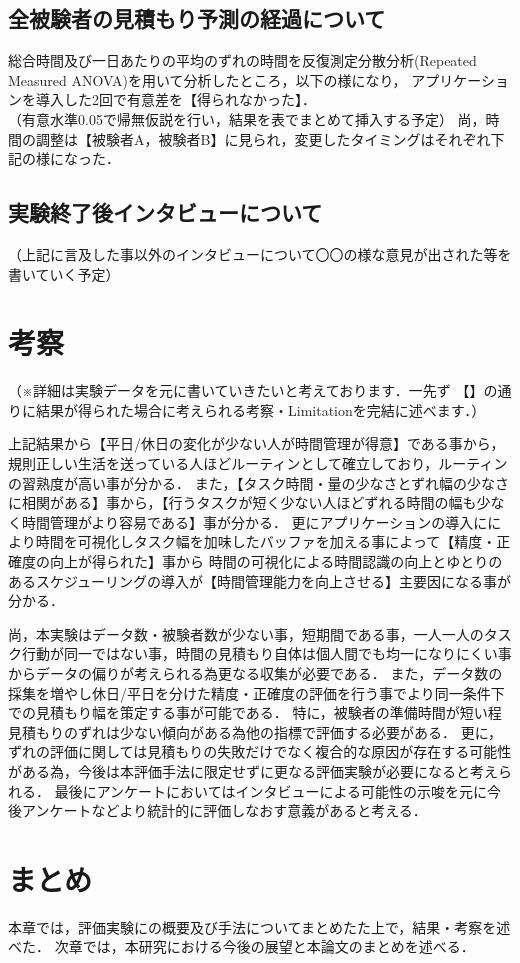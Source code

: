 \subsection{全被験者の見積もり予測の経過について}
総合時間及び一日あたりの平均のずれの時間を反復測定分散分析(Repeated Measured ANOVA)を用いて分析したところ，以下の様になり，
アプリケーションを導入した2回で有意差を【得られなかった】．
\\
（有意水準0.05で帰無仮説を行い，結果を表でまとめて挿入する予定）
尚，時間の調整は【被験者A，被験者B】に見られ，変更したタイミングはそれぞれ下記の様になった．


\subsection{実験終了後インタビューについて}
（上記に言及した事以外のインタビューについて〇〇の様な意見が出された等を書いていく予定）


\section{考察}
（※詳細は実験データを元に書いていきたいと考えております．一先ず
【】の通りに結果が得られた場合に考えられる考察・Limitationを完結に述べます．）

上記結果から【平日/休日の変化が少ない人が時間管理が得意】である事から，規則正しい生活を送っている人ほどルーティンとして確立しており，ルーティンの習熟度が高い事が分かる．
また，【タスク時間・量の少なさとずれ幅の少なさに相関がある】事から，【行うタスクが短く少ない人ほどずれる時間の幅も少なく時間管理がより容易である】事が分かる．
更にアプリケーションの導入ににより時間を可視化しタスク幅を加味したバッファを加える事によって【精度・正確度の向上が得られた】事から
時間の可視化による時間認識の向上とゆとりのあるスケジューリングの導入が【時間管理能力を向上させる】主要因になる事が分かる．

尚，本実験はデータ数・被験者数が少ない事，短期間である事，一人一人のタスク行動が同一ではない事，時間の見積もり自体は個人間でも均一になりにくい事からデータの偏りが考えられる為更なる収集が必要である．
また，データ数の採集を増やし休日/平日を分けた精度・正確度の評価を行う事でより同一条件下での見積もり幅を策定する事が可能である．
特に，被験者の準備時間が短い程見積もりのずれは少ない傾向がある為他の指標で評価する必要がある．
更に，ずれの評価に関しては見積もりの失敗だけでなく複合的な原因が存在する可能性がある為，今後は本評価手法に限定せずに更なる評価実験が必要になると考えられる．
最後にアンケートにおいてはインタビューによる可能性の示唆を元に今後アンケートなどより統計的に評価しなおす意義があると考える．

\section{まとめ}
本章では，評価実験にの概要及び手法についてまとめたた上で，結果・考察を述べた．
次章では，本研究における今後の展望と本論文のまとめを述べる．
